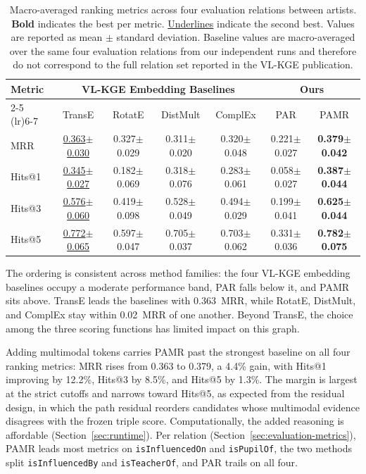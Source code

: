 \documentclass[runningheads]{llncs}
\begin{document}
\begin{table}[t]
  \centering
  \setlength{\tabcolsep}{2pt}
  \renewcommand{\arraystretch}{1.15}
  {\scriptsize
    \begin{tabular}{l|cccc|cc}
      \toprule
      \multirow{2}{*}{Metric} &
      \multicolumn{4}{|c|}{VL-KGE Embedding Baselines} &
      \multicolumn{2}{|c|}{Ours} \\
      \cmidrule(lr){2-5} \cmidrule(lr){6-7}
      & TransE & RotatE & DistMult & ComplEx & PAR & PAMR \\
      \midrule
      MRR  & \underline{0.363$\pm$0.030} & 0.327$\pm$0.029 & 0.311$\pm$0.020 & 0.320$\pm$0.048 & 0.221$\pm$0.027 & \textbf{0.379$\pm$0.042} \\
      Hits@1 & \underline{0.345$\pm$0.027} & 0.182$\pm$0.069 & 0.318$\pm$0.076 & 0.283$\pm$0.061 & 0.058$\pm$0.027 & \textbf{0.387$\pm$0.044} \\
      Hits@3 & \underline{0.576$\pm$0.060} & 0.419$\pm$0.098 & 0.528$\pm$0.049 & 0.494$\pm$0.029 & 0.199$\pm$0.041 & \textbf{0.625$\pm$0.044} \\
      Hits@5 & \underline{0.772$\pm$0.065} & 0.597$\pm$0.047 & 0.705$\pm$0.037 & 0.703$\pm$0.062 & 0.331$\pm$0.036 & \textbf{0.782$\pm$0.075} \\
      \bottomrule
  \end{tabular}}
  \caption{Macro-averaged ranking metrics across four evaluation
    relations between artists. \textbf{Bold} indicates the best per metric.
    \underline{Underlines} indicate the second best. Values are reported
    as mean $\pm$ standard deviation. Baseline values are macro-averaged
    over the same four evaluation relations from our independent runs
    and therefore do not correspond to the full relation set reported in
  the VL-KGE publication.}
  \label{tab:results}
\end{table}

The ordering is consistent across method families: the four VL-KGE
embedding baselines occupy a moderate performance band, PAR falls
below it, and PAMR sits above. TransE leads the baselines with
0.363~MRR, while RotatE, DistMult, and ComplEx stay within
0.02~MRR of one another. Beyond TransE, the choice among the three
scoring functions has limited impact on this graph.

Adding multimodal tokens carries PAMR past the strongest baseline on
all four ranking metrics: MRR rises from 0.363 to 0.379, a 4.4\% gain, with
Hits@1 improving by 12.2\%, Hits@3 by 8.5\%, and Hits@5 by 1.3\%. The
margin is largest at the strict cutoffs and narrows
toward Hits@5, as expected from the residual design, in which the path
residual reorders candidates whose multimodal evidence disagrees with the
frozen triple score. Computationally, the added reasoning is affordable
(Section~\ref{sec:runtime}). Per relation
(Section~\ref{sec:evaluation-metrics}), PAMR leads most metrics on
\texttt{isInfluencedOn} and \texttt{isPupilOf}, the two methods split
\texttt{isInfluencedBy} and \texttt{isTeacherOf}, and PAR trails on
all four.
\end{document}
